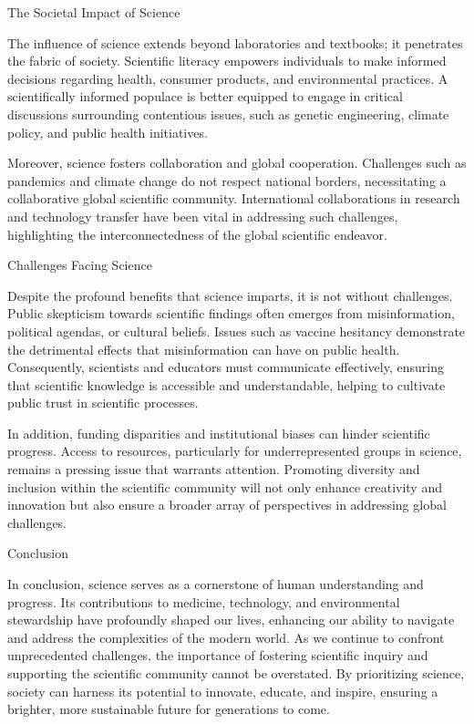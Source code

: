 \documentclass[12pt, a4paper, twocolumn]{article}
\begin{document}
The Societal Impact of Science

The influence of science extends beyond laboratories and textbooks; it penetrates the fabric of society. Scientific literacy empowers individuals to make informed decisions regarding health, consumer products, and environmental practices. A scientifically informed populace is better equipped to engage in critical discussions surrounding contentious issues, such as genetic engineering, climate policy, and public health initiatives.

Moreover, science fosters collaboration and global cooperation. Challenges such as pandemics and climate change do not respect national borders, necessitating a collaborative global scientific community. International collaborations in research and technology transfer have been vital in addressing such challenges, highlighting the interconnectedness of the global scientific endeavor.

Challenges Facing Science

Despite the profound benefits that science imparts, it is not without challenges. Public skepticism towards scientific findings often emerges from misinformation, political agendas, or cultural beliefs. Issues such as vaccine hesitancy demonstrate the detrimental effects that misinformation can have on public health. Consequently, scientists and educators must communicate effectively, ensuring that scientific knowledge is accessible and understandable, helping to cultivate public trust in scientific processes.

In addition, funding disparities and institutional biases can hinder scientific progress. Access to resources, particularly for underrepresented groups in science, remains a pressing issue that warrants attention. Promoting diversity and inclusion within the scientific community will not only enhance creativity and innovation but also ensure a broader array of perspectives in addressing global challenges.

Conclusion

In conclusion, science serves as a cornerstone of human understanding and progress. Its contributions to medicine, technology, and environmental stewardship have profoundly shaped our lives, enhancing our ability to navigate and address the complexities of the modern world. As we continue to confront unprecedented challenges, the importance of fostering scientific inquiry and supporting the scientific community cannot be overstated. By prioritizing science, society can harness its potential to innovate, educate, and inspire, ensuring a brighter, more sustainable future for generations to come.

\end{document}
